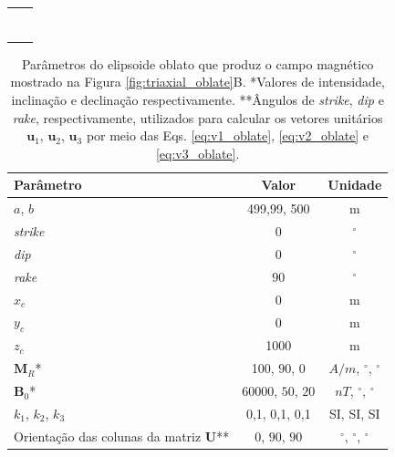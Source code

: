 \begin{table}[h!]
	\begin{center}
		\begin{tabular}{lc}
			
			&  \\
			& \\
			& \\
			&  \\
			& \\
			&  \\
			& \\
		\end{tabular}
	\end{center}
\end{table}

\begin{table}[h!]
	\begin{center}
		\begin{tabular}{|l|c|c|}
			\hline
			\textbf{Parâmetro}  & \textbf{Valor} & \textbf{Unidade} \\
			\hline 
			$a$, $b$   & 499,99, 500 & m\\
			\hline
			\textit{strike}   & $0$ & $^{\circ}$\\
			\hline
			\textit{dip}    & $0$ & $^{\circ}$\\
			\hline
			\textit{rake}   & $90$  & $^{\circ}$\\
			\hline
			$x_c$   & 0  & m\\
			\hline          
			$y_c$   & 0  & m\\
			\hline                
			$z_c$   & 1000  & m\\
			\hline
			$\mathbf{M}_{R}$*  & 100, $90$, $0$  & $A/m$, $^{\circ}$, $^{\circ}$\\
			\hline
			$\mathbf{B}_{0}$*    & 60000, $50$, $20$ & $nT$, $^{\circ}$, $^{\circ}$ \\
			\hline
			$k_{1}$, $k_{2}$, $k_{3}$   & 0,1, 0,1, 0,1 & SI, SI, SI \\
			\hline
			Orientação das colunas da matriz $\mathbf{U}$**   & $0$, $90$, $90$ & $^{\circ}$, $^{\circ}$, $^{\circ}$ \\
			\hline
		\end{tabular}
		\caption{Parâmetros do elipsoide oblato que produz o campo magnético mostrado na Figura \ref{fig:triaxial_oblate}B. *Valores de intensidade, inclinação e declinação respectivamente. **Ângulos de \textit{strike}, \textit{dip}  e \textit{rake}, respectivamente, utilizados para calcular os vetores unitários $\mathbf{u}_{1}$, $\mathbf{u}_{2}$, $\mathbf{u}_{3}$ por meio das Eqs. \ref{eq:v1_oblate}, \ref{eq:v2_oblate} e \ref{eq:v3_oblate}.}
	\end{center}
	\label{tab:triaxial_oblate2}
\end{table}

